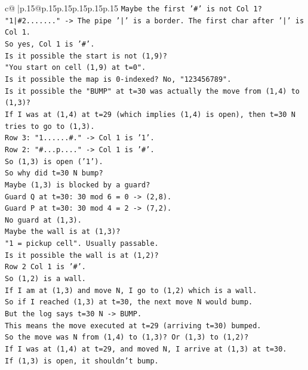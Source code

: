 \documentclass{article}
\begin{document}
{\begin{supertabular}{c@{$\;$}|p{.15\linewidth}@{}p{.15\linewidth}p{.15\linewidth}p{.15\linewidth}p{.15\linewidth}p{.15\linewidth}}
{{{\texttt{Maybe the first '\#' is not Col 1?} \\
\texttt{"1|\#2......." {-}> The pipe '|' is a border. The first char after '|' is Col 1.} \\
\texttt{So yes, Col 1 is '\#'.} \\
\texttt{Is it possible the start is not (1,9)?} \\
\texttt{"You start on cell (1,9) at t=0".} \\
\texttt{Is it possible the map is 0{-}indexed? No, "123456789".} \\
\texttt{Is it possible the "BUMP" at t=30 was actually the move from (1,4) to (1,3)?} \\
\texttt{If I was at (1,4) at t=29 (which implies (1,4) is open), then t=30 N tries to go to (1,3).} \\
\texttt{Row 3: "1......\#." {-}> Col 1 is '1'.} \\
\texttt{Row 2: "\#...p...." {-}> Col 1 is '\#'.} \\
\texttt{So (1,3) is open ('1').} \\
\texttt{So why did t=30 N bump?} \\
\texttt{Maybe (1,3) is blocked by a guard?} \\
\texttt{Guard Q at t=30: 30 mod 6 = 0 {-}> (2,8).} \\
\texttt{Guard P at t=30: 30 mod 4 = 2 {-}> (7,2).} \\
\texttt{No guard at (1,3).} \\
\texttt{Maybe the wall is at (1,3)?} \\
\texttt{"1 = pickup cell". Usually passable.} \\
\texttt{Is it possible the wall is at (1,2)?} \\
\texttt{Row 2 Col 1 is '\#'.} \\
\texttt{So (1,2) is a wall.} \\
\texttt{If I am at (1,3) and move N, I go to (1,2) which is a wall.} \\
\texttt{So if I reached (1,3) at t=30, the next move N would bump.} \\
\texttt{But the log says t=30 N {-}> BUMP.} \\
\texttt{This means the move executed at t=29 (arriving t=30) bumped.} \\
\texttt{So the move was N from (1,4) to (1,3)? Or (1,3) to (1,2)?} \\
\texttt{If I was at (1,4) at t=29, and moved N, I arrive at (1,3) at t=30.} \\
\texttt{If (1,3) is open, it shouldn't bump.} \\
}}}
\end{supertabular}}
\end{document}
